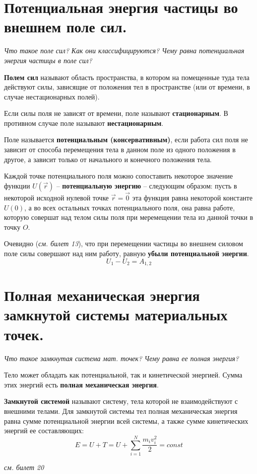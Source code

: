 \documentclass{article}
\begin{document}
  \section{Потенциальная энергия частицы во внешнем поле сил.}
    \par
      \textit{Что такое поле сил? Как они классифицируются? Чему равна потенциальная энергия частицы в поле сил?}\\
    \par     
      \textbf{Полем сил} называют область пространства, в котором на помещенные туда тела действуют силы, зависящие от положения тел в пространстве (или от времени, в случае нестационарных полей).
    \par
      Если силы поля не зависят от времени, поле называют \textbf{стационарным}. В противном случае поле называют \textbf{нестационарным}.
    \par
      Поле называется \textbf{потенциальным (консервативным)}, если работа сил поля не зависит от способа перемещения тела в данном поле из одного положения в другое, а зависит только от начального и конечного положения тела. 
    \par
      Каждой точке потенциального поля можно сопоставить некоторое значение функции $U(\vec r)$ -- \textbf{потенциальную энергию} -- следующим образом: пусть в некоторой исходной нулевой точке $\vec r=\vec 0$ эта функция равна некоторой константе $U(0)$, а во всех остальных точках потенциального поля, она равна работе, которую совершат над телом силы поля при меремещении тела из данной точки в точку $O$.
    \par
      Очевидно (\textit{см. билет 13}), что при перемещении частицы во внешнем силовом поле силы совершают над ним работу, равную \textbf{убыли потенциальной энергии}.
      \begin{equation}
	U_1-U_2=A_{1,2}
      \end{equation}
  \clearpage  
  
   \section{Полная механическая энергия замкнутой системы материальных точек.}
    \par
      \textit{Что такое замкнутая система мат. точек? Чему равна ее полная энергия?}
    \par
      Тело может обладать как потенциальной, так и кинетической энергией. Сумма этих энергий есть \textbf{полная механическая энергия}.
    \par
      \textbf{Замкнутой системой} называют систему, тела которой не взаимодействуют с внешними телами. Для замкнутой системы тел полная механическая энергия равна сумме потенциальной энергии всей системы, а также сумме кинетических энергий ее составляющих:
      \begin{equation}
	E=U+T=U+\sum_{i=1}^{N}\frac{m_iv_i^2}{2}=const
      \end{equation}
    \par
      \textit{см. билет 20}
  \clearpage
  
\end{document}
